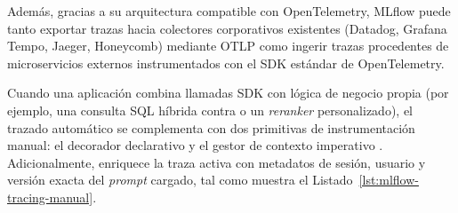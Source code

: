 Además, gracias a su arquitectura compatible con OpenTelemetry, MLflow puede tanto exportar trazas hacia colectores corporativos existentes (Datadog, Grafana Tempo, Jaeger, Honeycomb) mediante OTLP como ingerir trazas procedentes de microservicios externos instrumentados con el SDK estándar de OpenTelemetry.

Cuando una aplicación combina llamadas SDK con lógica de negocio propia (por ejemplo, una consulta SQL híbrida contra  o un \textit{reranker} personalizado), el trazado automático se complementa con dos primitivas de instrumentación manual: el decorador declarativo  y el gestor de contexto imperativo . Adicionalmente,  enriquece la traza activa con metadatos de sesión, usuario y versión exacta del \textit{prompt} cargado, tal como muestra el Listado~\ref{lst:mlflow-tracing-manual}.

